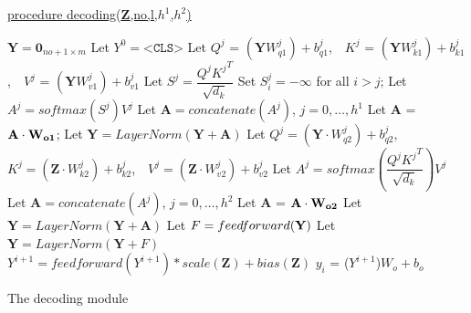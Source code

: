 \documentclass[algorithms,article,submit,pdftex,moreauthors]{Definitions/mdpi}
\begin{document}
\begin{algorithm2e} 

        \underline{procedure decoding({\bf Z},no,l,$h^1$,$h^2$)} 
        
        
        \label{dec:start}
        $\textbf{Y} = \textbf{0}_{no + 1 \times m}$ \; 	\label{dec:output}
        Let $Y^0 = \texttt{<CLS>}$ \;					\label{dec:cls}
	{       \label{dec:outer}
            {	\label{dec:decblock1}
                {   \label{dec:self1}
                    Let $Q^j$ = $(\textbf{Y}W_{q1}^j) + b_{q1}^j$,  \,\, 
                            $K^j$ = $(\textbf{Y}W_{k1}^j) + b_{k1}^j$,  \,\, 
                            $V^j$ = $(\textbf{Y}W_{v1}^j) + b_{v1}^j$   \;
                            \label{dec:selfproj}
                    Let $S^j = \dfrac{Q^j{K^j}^T}{\sqrt{d_k}}$\; \label{dec:scaled1}
                    Set $S_i^j=-\infty$ for all $i>j$; 
                    \label{dec:masking}
                    Let $A^j = softmax\left(S^j\right)V^j$
                    \label{dec:softmax}
                }   \label{dec:self2}
                Let $\textbf{A}=concatenate(A^j)$, $j=0,\dots,h^1$\; \label{dec:concatenation1}
                Let {\bf A} = ${\bf A \cdot W_{o1}}$;  \label{dec:outproject1}
                Let $\textbf{Y} = LayerNorm(\textbf{Y} + \textbf{A})$\; \label{dec:norm1}
                {   \label{dec:cross1}
                    Let $Q^j=(\textbf{Y}\cdot W_{q2}^j) + b_{q2}^j$, \,\,
                            $K^j=(\textbf{Z}\cdot W_{k2}^j) + b_{k2}^j$, \,\, 
                            $V^j=(\textbf{Z}\cdot W_{v2}^j) + b_{v2}^j$\;
                    \label{dec:crossproj}
                    Let $A^{j} = softmax\left(\dfrac{Q^j{K^j}^T}{\sqrt{d_k}}\right)V^j$\;
                    \label{dec:scaled2}
                }   \label{dec:cross2}
                Let $\textbf{A}=concatenate(A^j)$, $j=0,\dots,h^2$\;
                \label{dec:concatenation2}
                Let {\bf A} = ${\bf A \cdot W_{o2}}$\;
                \label{dec:outproject2}
                Let $\textbf{Y} = LayerNorm(\textbf{Y} + \textbf{A})$\;
                \label{dec:norm2}
                Let $F = feedforward({\bf Y})$\;
                \label{dec:ffn}
                Let $\textbf{Y} = LayerNorm(\textbf{Y} + F)$\;
                \label{dec:norm3}
            } \label{dec:decblock2}
            $Y^{i + 1} = feedforward(Y^{i + 1})  * scale(\textbf{Z}) + bias(\textbf{Z})$\; \label{dec:finalproj}
            $y_i$ = ($Y^{i + 1}$)$W_o + b_o$
        } \label{dec:outer2}                     
    	\caption{The decoding module} 
    \label{algo:decoding}
\end{algorithm2e}
\end{document}
